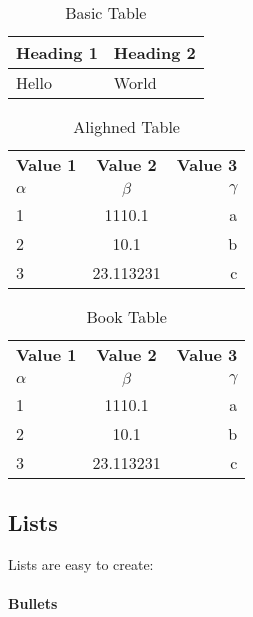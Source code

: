 \documentclass{report}[a4paper,12pt] %
\begin{document}
\begin{table}[!h]
  \centering
  \caption{Basic Table}
  \begin{tabular}{|l|l|}
  \hline
      \textbf{Heading 1} & \textbf{Heading 2} \\ \hline
      Hello & World \\ \hline
  \end{tabular}
  \label{tab:basic}
\end{table}

\begin{table}[h!]
  \begin{center}
    \caption{Alighned Table}
    \label{tab:alighned}
    \begin{tabular}{l|c|r} %
      \textbf{Value 1} & \textbf{Value 2} & \textbf{Value 3}\\
      $\alpha$ & $\beta$ & $\gamma$ \\
      \hline
      1 & 1110.1 & a\\
      2 & 10.1 & b\\
      3 & 23.113231 & c\\
    \end{tabular}
  \end{center}
\end{table}

\begin{table}[h!]
  \centering
  \caption{Book Table}
  \label{tab:book}
  \begin{tabular}{@{}lcr@{}} %
    \toprule %
    \textbf{Value 1} & \textbf{Value 2} & \textbf{Value 3}\\
    $\alpha$ & $\beta$ & $\gamma$ \\
    \midrule %
    1 & 1110.1 & a\\
    2 & 10.1 & b\\
    3 & 23.113231 & c\\
    \bottomrule %
  \end{tabular}
\end{table}

\subsection{Lists}
Lists are easy to create:
\paragraph{Bullets}
\end{document}
